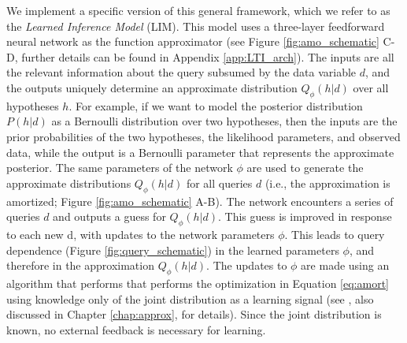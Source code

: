 We implement a specific version of this general framework, which we refer to as the \emph{Learned Inference Model} (LIM). This model uses a three-layer feedforward neural network as the function approximator (see Figure \ref{fig:amo_schematic} C-D, further details can be found in Appendix \ref{app:LTI_arch}). The inputs are all the relevant information about the query subsumed by the data variable $d$, and the outputs uniquely determine an approximate distribution $Q_\phi(h|d)$ over all hypotheses $h$. For example, if we want to model the posterior distribution $P(h|d)$ as a Bernoulli distribution over two hypotheses, then the inputs are the prior probabilities of the two hypotheses, the likelihood parameters, and observed data, while the output is a Bernoulli parameter that represents the approximate posterior. The same parameters of the network $\phi$ are used to generate the approximate distributions $Q_\phi(h|d)$ for all queries $d$ (i.e., the approximation is amortized; Figure \ref{fig:amo_schematic} A-B). The network encounters a series of queries $d$ and outputs a guess for $Q_\phi(h|d)$. This guess is improved in response to each new d, with updates to the network parameters $\phi$. This leads to query dependence (Figure \ref{fig:query_schematic}) in the learned parameters $\phi$, and therefore in the approximation $Q_\phi(h|d)$. The updates to $\phi$ are made using an algorithm that performs that performs the optimization in Equation \ref{eq:amort} using knowledge only of the joint distribution as a learning signal (see \citet{ranganath2014black}, also discussed in Chapter \ref{chap:approx}, for details). Since the joint distribution is known, no external feedback is necessary for learning.

